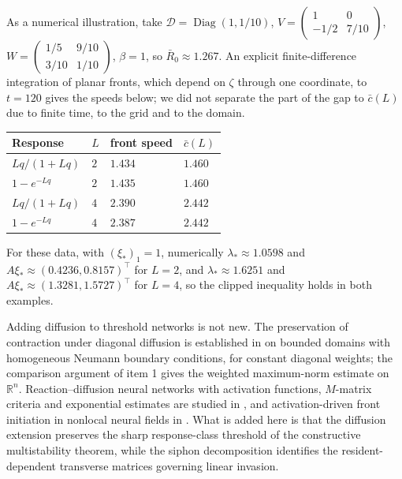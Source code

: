 As a numerical illustration, take $\mathcal D=\operatorname{Diag}(1,1/10)$, $V=\begin{pmatrix}1&0\\-1/2&7/10\end{pmatrix}$,
$W=\begin{pmatrix}1/5&9/10\\3/10&1/10\end{pmatrix}$, $\beta=1$, so $\bar R_0\approx1.267$. An explicit finite-difference integration of planar fronts, which depend on $\zeta$ through one coordinate, to $t=120$ gives the speeds below;
we did not separate the part of the gap to $\bar c(L)$ due to finite time, to the grid and to the domain.
\begin{center}
\begin{tabular}{llll}
\hline
Response & $L$ & front speed & $\bar c(L)$\\\hline
$Lq/(1+Lq)$ & $2$ & $1.434$ & $1.460$\\
$1-e^{-Lq}$ & $2$ & $1.435$ & $1.460$\\
$Lq/(1+Lq)$ & $4$ & $2.390$ & $2.442$\\
$1-e^{-Lq}$ & $4$ & $2.387$ & $2.442$\\\hline
\end{tabular}
\end{center}
For these data, with $(\xi_*)_1=1$, numerically $\lambda_*\approx1.0598$ and $A\xi_*\approx(0.4236,0.8157)^\top$ for $L=2$, and $\lambda_*\approx1.6251$ and $A\xi_*\approx(1.3281,1.5727)^\top$ for $L=4$, so the clipped inequality holds in both examples.
\eeR

Adding diffusion to threshold networks is not new. The preservation of contraction under diagonal diffusion is established in \cite{AminzareSontag2012} on bounded domains with homogeneous Neumann boundary conditions, for constant diagonal weights; the comparison argument of item 1 gives the weighted maximum-norm estimate on $\mathbb R^n$. Reaction--diffusion neural networks with activation functions, $M$-matrix criteria and exponential estimates are studied in \cite{SongCaoZhao2006}, and activation-driven front initiation in nonlocal neural fields in \cite{FayeKilpatrick2018}. What is added here is that the diffusion extension preserves the sharp response-class threshold of the constructive multistability theorem, while the siphon decomposition identifies the resident-dependent transverse matrices governing linear invasion.
\eeR

